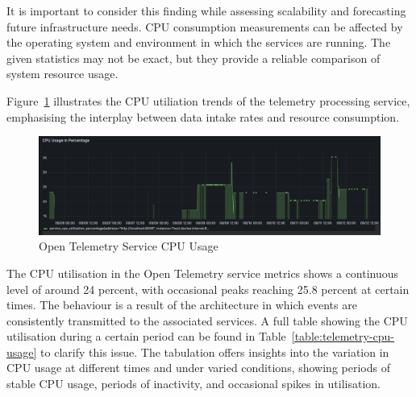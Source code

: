 \documentclass[preprint,12pt]{elsarticle}
\begin{document}
It is important to consider this finding while assessing scalability and forecasting future infrastructure needs. CPU consumption measurements can be affected by the operating system and environment in which the services are running. The given statistics may not be exact, but they provide a reliable comparison of system resource usage.

Figure~\ref{openTelemetryServiceCpuUsage} illustrates the CPU utiliation trends of the telemetry processing service, emphasising the interplay between data intake rates and resource consumption.

\begin{figure}[h!]
    \centering
    \includegraphics[width=\textwidth]{images/Open-telemetry-service-CPU-usage.png}
    \caption{Open Telemetry Service CPU Usage}
    \label{openTelemetryServiceCpuUsage}
\end{figure}

The CPU utilisation in the Open Telemetry service metrics shows a continuous level of around 24 percent, with occasional peaks reaching 25.8 percent at certain times. The behaviour is a result of the architecture in which events are consistently transmitted to the associated services. A full table showing the CPU utilisation during a certain period can be found in Table~\ref{table:telemetry-cpu-usage} to clarify this issue. The tabulation offers insights into the variation in CPU usage at different times and under varied conditions, showing periods of stable CPU usage, periods of inactivity, and occasional spikes in utilisation.
\end{document}
